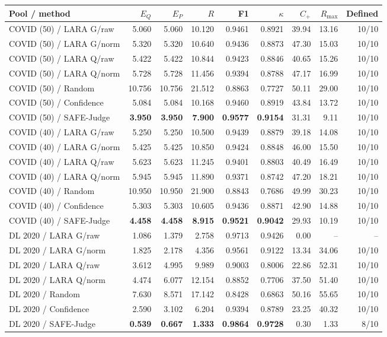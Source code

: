 \begin{longtable}{@{}lrrrrrrrr@{}}
\toprule
Pool / method & $E_Q$ & $E_P$ & $R$ & F1 & $\kappa$ & $C_+$ & $R_{\max}$ & Defined \\
\midrule
\endhead
COVID (50) / LARA G/raw & 5.060 & 5.060 & 10.120 & 0.9461 & 0.8921 & 39.94 & 13.16 & 10/10 \\
COVID (50) / LARA G/norm & 5.320 & 5.320 & 10.640 & 0.9436 & 0.8873 & 47.30 & 15.03 & 10/10 \\
COVID (50) / LARA Q/raw & 5.422 & 5.422 & 10.844 & 0.9423 & 0.8846 & 40.65 & 15.26 & 10/10 \\
COVID (50) / LARA Q/norm & 5.728 & 5.728 & 11.456 & 0.9394 & 0.8788 & 47.17 & 16.99 & 10/10 \\
COVID (50) / Random & 10.756 & 10.756 & 21.512 & 0.8863 & 0.7727 & 50.11 & 29.00 & 10/10 \\
COVID (50) / Confidence & 5.084 & 5.084 & 10.168 & 0.9460 & 0.8919 & 43.84 & 13.72 & 10/10 \\
COVID (50) / SAFE-Judge & \textbf{3.950} & \textbf{3.950} & \textbf{7.900} & \textbf{0.9577} & \textbf{0.9154} & 31.31 & 9.11 & 10/10 \\
COVID (40) / LARA G/raw & 5.250 & 5.250 & 10.500 & 0.9439 & 0.8879 & 39.18 & 14.08 & 10/10 \\
COVID (40) / LARA G/norm & 5.425 & 5.425 & 10.850 & 0.9424 & 0.8848 & 46.00 & 15.50 & 10/10 \\
COVID (40) / LARA Q/raw & 5.623 & 5.623 & 11.245 & 0.9401 & 0.8803 & 40.49 & 16.49 & 10/10 \\
COVID (40) / LARA Q/norm & 5.945 & 5.945 & 11.890 & 0.9371 & 0.8742 & 47.20 & 18.21 & 10/10 \\
COVID (40) / Random & 10.950 & 10.950 & 21.900 & 0.8843 & 0.7686 & 49.99 & 30.23 & 10/10 \\
COVID (40) / Confidence & 5.303 & 5.303 & 10.605 & 0.9436 & 0.8871 & 42.90 & 14.88 & 10/10 \\
COVID (40) / SAFE-Judge & \textbf{4.458} & \textbf{4.458} & \textbf{8.915} & \textbf{0.9521} & \textbf{0.9042} & 29.93 & 10.19 & 10/10 \\
DL 2020 / LARA G/raw & 1.086 & 1.379 & 2.758 & 0.9713 & 0.9426 & 0.00 & -- & -- \\
DL 2020 / LARA G/norm & 1.825 & 2.178 & 4.356 & 0.9561 & 0.9122 & 13.34 & 34.06 & 10/10 \\
DL 2020 / LARA Q/raw & 3.612 & 4.995 & 9.989 & 0.9003 & 0.8006 & 22.86 & 52.31 & 10/10 \\
DL 2020 / LARA Q/norm & 4.474 & 6.077 & 12.154 & 0.8852 & 0.7706 & 37.50 & 51.40 & 10/10 \\
DL 2020 / Random & 7.630 & 8.571 & 17.142 & 0.8428 & 0.6863 & 50.16 & 55.65 & 10/10 \\
DL 2020 / Confidence & 2.590 & 3.102 & 6.204 & 0.9394 & 0.8789 & 23.25 & 40.32 & 10/10 \\
DL 2020 / SAFE-Judge & \textbf{0.539} & \textbf{0.667} & \textbf{1.333} & \textbf{0.9864} & \textbf{0.9728} & 0.30 & 1.33 & 8/10 \\
\bottomrule
\end{longtable}
